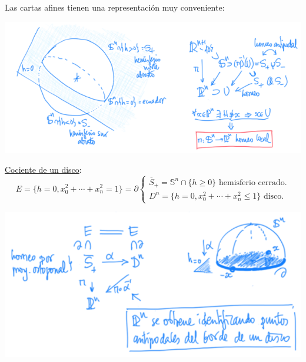 \documentclass[10pt,a4paper,openright]{book}
\theoremstyle{break}
\begin{document}
Las cartas afines tienen una representación muy conveniente:
\begin{center}
    \includegraphics[scale=0.3]{images/repr_carta_afin} 
\end{center}

\underline{Cociente de un disco}:
\[
E = \{h = 0, x_0^2 + \cdots + x_n^2 = 1\} = \partial \begin{cases}
    \overline{S}_+ = \mathbb{S}^n \cap \{h \ge 0\} \text{ hemisferio cerrado.} \\
    D^n = \{h = 0, x_0^2 + \cdots + x_n^2 \le 1\} \text{ disco.} 
\end{cases} 
\]
\begin{center}
    \includegraphics[scale=0.3]{images/cociente_disco} 
\end{center}
\end{document}

